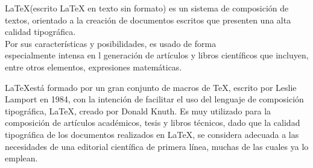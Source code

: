 \documentclass{book}
\begin{document}
\LaTeX (escrito LaTeX en texto sin formato) es un        sistema de composición de textos, orientado a la
creación de documentos escritos que presenten una alta calidad tipográfica. \\[2pt] Por sus características y posibilidades, es usado de forma \\ especialmente intensa en l generación de artículos y libros científicos que incluyen, entre otros elementos, expresiones matemáticas.

\LaTeX está formado por un gran conjunto de macros de TeX, escrito por Leslie Lamport en 1984, con la intención de facilitar el uso del lenguaje de composición tipográfica, \LaTeX, creado por Donald Knuth. Es muy utilizado para la composición de artículos académicos, tesis y libros técnicos, dado que la calidad tipográfica de los documentos realizados en LaTeX, se considera adecuada a las necesidades de una editorial científica de primera línea, muchas de las cuales ya lo emplean.
\end{document}
